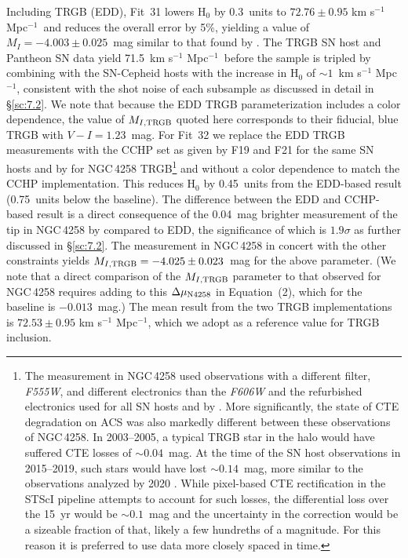 \documentclass[12pt]{aastex631}
\newcommand{\kms}{km s$^{-1}$ Mpc$^{-1}$}
\newcommand{\kmss }{km s$^{-1}$ Mpc$^{-1}$\ }
\newcommand{\hwtrgb}{$ 72.76 \pm 0.95 $ km s$^{-1}$ Mpc$^{-1}$}
\newcommand{\hwtrgbmean}{$ 72.53 \pm 0.95 $ km s$^{-1}$ Mpc$^{-1}$}
\begin{document}
Including TRGB (EDD), Fit~31 lowers H$_0$ by 0.3~units to \hwtrgb\ and reduces the overall error by 5\%, yielding a value of $M_I=-4.003\pm0.025$~mag similar to that found by \citet{Anand:2021}.
The TRGB SN host and Pantheon SN data yield 71.5~\kmss before the sample is tripled by combining with the SN-Cepheid hosts with the increase in H$_0$ of $\sim1$~\kms, consistent with the shot noise of each subsample as discussed in detail in \S\ref{sc:7.2}.
We note that because the EDD TRGB parameterization includes a color dependence, the value of $M_{I,\rm{TRGB}}$ quoted here corresponds to their fiducial, blue TRGB with $V\!-\!I=1.23$~mag. 
For Fit~32 we replace the EDD TRGB measurements with the CCHP set as given by F19 and F21 for the same SN hosts and by \citet{Jang:2021} for NGC$\,$4258 TRGB\footnote{The \citet{Jang:2021} measurement in NGC$\,$4258 used observations with a different filter, {\it F555W}, and different electronics than the {\it F606W} and the refurbished electronics used for all SN hosts and by \citet{Anand:2021}. More significantly, the state of CTE degradation on ACS was also markedly different between these observations of NGC$\,$4258.   In 2003--2005, a typical TRGB star in the halo would have suffered CTE losses of $\sim 0.04$~mag.  At the time of the SN host observations in 2015--2019, such stars would have lost $\sim 0.14$~mag, more similar to the observations analyzed by 2020 \cite{Anand:2021}. While pixel-based CTE rectification in the STScI pipeline attempts to account for such losses, the differential loss over the 15~yr would be $\sim 0.1$~mag and the uncertainty in the correction would be a sizeable fraction of that, likely a few hundreths of a magnitude. For this reason it is preferred to use data more closely spaced in time.} and without a color dependence to match the CCHP implementation.  This reduces H$_0$ by 0.45~units from the EDD-based result (0.75~units below the baseline).  The difference between the EDD and CCHP-based result is a direct consequence of the 0.04~mag brighter measurement of the tip in NGC$\,$4258 by \citet{Jang:2021} compared to EDD, the significance of which is $1.9\sigma$ as further discussed in \S\ref{sc:7.2}.  The \citet{Jang:2021} measurement in NGC$\,$4258 in concert with the other constraints  yields $M_{I,\rm{TRGB}}=-4.025 \pm 0.023$~mag for the above parameter. (We note that a direct comparison of the $M_{I,\rm{TRGB}}$ parameter to that observed for NGC$\,$4258 requires adding to this $\Delta \mu_{\rm N4258}$ in Equation~(2), which for the baseline is $-0.013$~mag.) The mean result from the two TRGB implementations is \hwtrgbmean, which we adopt as a reference value for TRGB inclusion.
\end{document}
